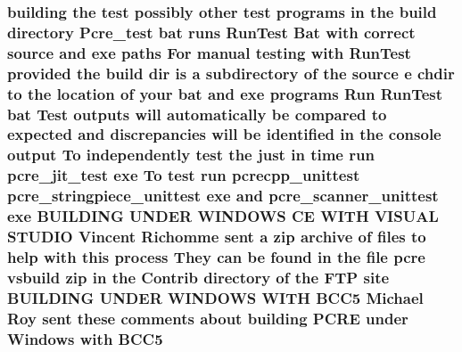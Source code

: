 \subsubsection[{\texorpdfstring{B\+C\+C5}{BCC5}}]{\setlength{\rightskip}{0pt plus 5cm}building the test possibly other test programs {\bf in} the build {\bf directory} Pcre\+\_\+test {\bf bat} runs Run\+Test Bat {\bf with} correct {\bf source} and {\bf exe} paths For manual testing {\bf with} Run\+Test provided the build {\bf dir} {\bf is} {\bf a} subdirectory {\bf of} the {\bf source} {\bf e} chdir {\bf to} the {\bf location} {\bf of} your {\bf bat} and {\bf exe} programs Run Run\+Test {\bf bat} Test outputs will automatically {\bf be} compared {\bf to} {\bf expected} and discrepancies will {\bf be} identified {\bf in} the console {\bf output} To independently test the just {\bf in} {\bf time} {\bf run} pcre\+\_\+jit\+\_\+test {\bf exe} To test {\bf run} pcrecpp\+\_\+unittest pcre\+\_\+stringpiece\+\_\+unittest {\bf exe} and pcre\+\_\+scanner\+\_\+unittest {\bf exe} B\+U\+I\+L\+D\+I\+NG U\+N\+D\+ER W\+I\+N\+D\+O\+WS CE W\+I\+TH V\+I\+S\+U\+AL S\+T\+U\+D\+IO Vincent Richomme {\bf sent} {\bf a} zip archive {\bf of} {\bf files} {\bf to} help {\bf with} {\bf this} {\bf process} They {\bf can} {\bf be} {\bf found} {\bf in} the {\bf file} {\bf pcre} vsbuild zip {\bf in} the Contrib {\bf directory} {\bf of} the F\+TP {\bf site} B\+U\+I\+L\+D\+I\+NG U\+N\+D\+ER W\+I\+N\+D\+O\+WS W\+I\+TH B\+C\+C5 Michael Roy {\bf sent} these comments about building {\bf P\+C\+RE} under {\bf Windows} {\bf with} B\+C\+C5}\hypertarget{NON-AUTOTOOLS-BUILD_8txt_a396c7aba9ca4f44e834c3d9ad91d2233}{}\label{NON-AUTOTOOLS-BUILD_8txt_a396c7aba9ca4f44e834c3d9ad91d2233}
